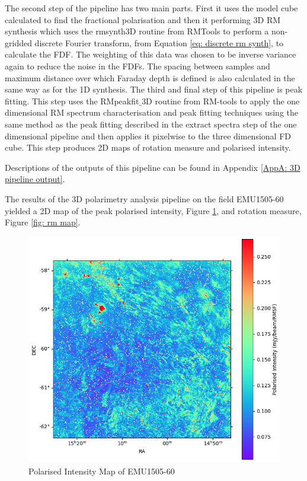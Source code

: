 The second step of the pipeline has two main parts. First it uses the model cube calculated to find the fractional polarisation and then it performing 3D RM synthesis which uses the rmsynth3D routine from RMTools to perform a non-gridded discrete Fourier transform, from Equation \ref{eq: discrete rm synth}, to calculate the FDF. The weighting of this data was chosen to be inverse variance again to reduce the noise in the FDFs. 
The spacing between samples and maximum distance over which Faraday depth is defined is also calculated in the same way as for the 1D synthesis. 
The third and final step of this pipeline is peak fitting. This step uses the RMpeakfit$\_$3D routine from RM-tools to apply the one 
dimensional RM spectrum characterisation and peak fitting techniques using the same method as the peak fitting described in the extract spectra step of the one dimensional pipeline and then applies it pixelwise to the three dimensional FD cube. This step produces 2D maps of rotation measure and polarised intensity.

Descriptions of the outputs of this pipeline can be found in Appendix \ref{AppA: 3D pipeline output}.

The results of the 3D polarimetry analysis pipeline on the field EMU1505-60 yielded a 2D map of the peak polarised intensity, Figure \ref{fig: pi map}, and rotation measure, Figure \ref{fig: rm map}. 

\begin{figure}
    \centering
    \includegraphics[width=1\linewidth]{Thesis_Template//Figures/Pi map.png}
    \caption{Polarised Intensity Map of EMU1505-60}
    \label{fig: pi map}
\end{figure}

